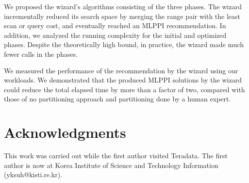 \documentclass[runningheads]{comsis2}
\begin{document}
We proposed the wizard's algorithms consisting of the three phases. 
The wizard incrementally reduced its search space by merging 
the range pair with the least scan or query cost, and eventually reached an MLPPI recommendation. 
In addition, we analyzed the running complexity for the initial and optimized phases. 
Despite the theoretically high bound, in practice, the wizard made much fewer calls in the phases.

We measured the performance of the recommendation by the wizard using 
our workloads.  
We demonstrated that the produced MLPPI solutions by 
the wizard could reduce the total elapsed time by more than a factor of two, 
compared with those of no partitioning approach and partitioning 
done by a human expert. 

\section*{Acknowledgments} 
This work was carried out while the first author visited Teradata. 
The first author is now at Korea Institute of Science and Technology Information (yksuh@kisti.re.kr).

\end{document}
